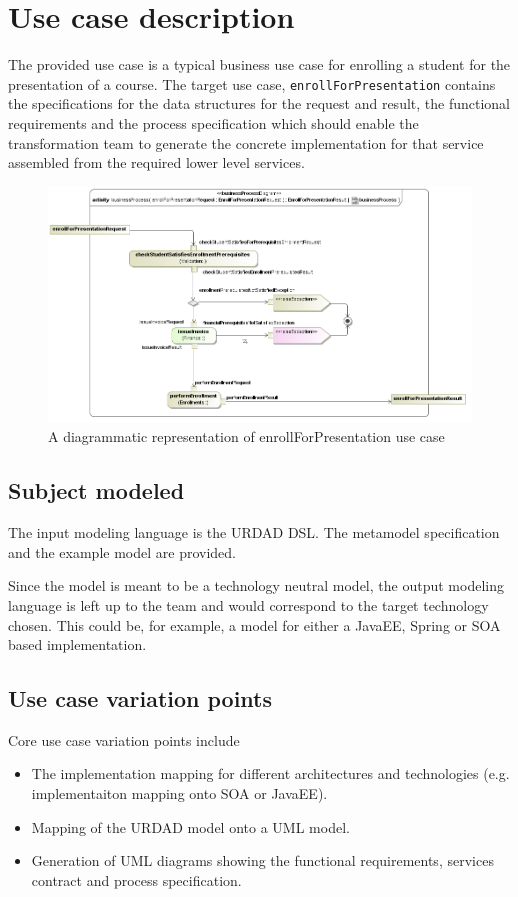 \section{Use case description}

The provided use case is a typical business use case for enrolling a student for the presentation of a course. The target use case,
\verb+enrollForPresentation+ contains the specifications for the data structures for the request and result, the functional requirements
and the process specification which should enable the transformation team to generate the concrete implementation for that service
assembled from the required lower level services.


\begin{figure}
  \centering
  \includegraphics[width=\linewidth]{businessProcess}
  \caption{A diagrammatic representation of enrollForPresentation use case}
  \label{fig:businessProcess}
\end{figure}


\subsection{Subject modeled}

The input modeling language is the URDAD DSL. The metamodel specification and the example model are provided.

Since the model is meant to be a technology neutral model, the output modeling language is left up to the team and would correspond to the target technology chosen. This could be, for example, a model for either a JavaEE, Spring or SOA based implementation.

\subsection{Use case variation points}
Core use case variation points include
\begin{itemize}
  \item The implementation mapping for different architectures and technologies (e.g. implementaiton mapping onto SOA or JavaEE).
  \item Mapping of the URDAD model onto a UML model.
  \item Generation of UML diagrams showing the functional requirements, services contract and process specification.
\end{itemize}
